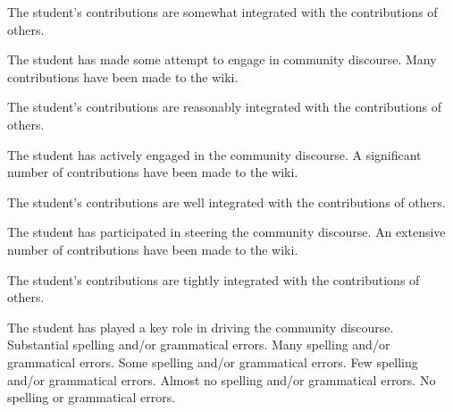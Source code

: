\documentclass{../../fal_assignment}
\begin{document}
\begin{markingrubric}
        \par		The student's contributions are somewhat integrated with the contributions of others.
        \par		The student has made some attempt to engage in community discourse.
        \grade 		Many contributions have been made to the wiki.
        \par		The student's contributions are reasonably integrated with the contributions of others.
        \par		The student has actively engaged in the community discourse.
        \grade 		A significant number of contributions have been made to the wiki.
        \par		The student's contributions are well integrated with the contributions of others.
        \par		The student has participated in steering the community discourse.
        \grade 		An extensive number of contributions have been made to the wiki.
        \par		The student's contributions are tightly integrated with the contributions of others.
        \par		The student has played a key role in driving the community discourse.
%
        \grade\fail 	Substantial spelling and/or grammatical errors.
        \grade 		Many spelling and/or grammatical errors.
        \grade 		Some spelling and/or grammatical errors.  
        \grade 		Few spelling and/or grammatical errors.
        \grade 		Almost no spelling and/or grammatical errors.
        \grade 		No spelling or grammatical errors.
\end{markingrubric}
\end{document}
